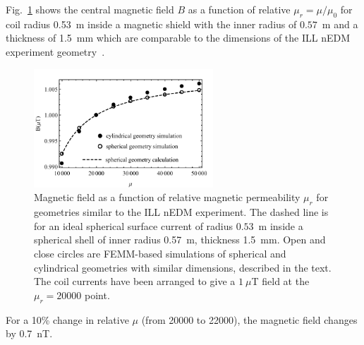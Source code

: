 \documentclass[review]{elsarticle}
\begin{document}

%
Fig.~\ref{fig:Magnetic_Field} shows the central magnetic field $B$ as
a function of relative $\mu_r=\mu/\mu_0$ for coil radius 0.53~m inside
a magnetic shield with the inner radius of $0.57$~m and a thickness of
1.5~mm which are comparable to the dimensions of the ILL nEDM
experiment geometry~\cite{bib:baker,bib:knecht}.
\begin{figure}[h!]
\begin{center}
   \includegraphics[width=0.6\textwidth]{femm_and_calcs.pdf}
    \caption{Magnetic field as a function of relative magnetic
      permeability $\mu_r$ for geometries similar to the ILL nEDM
      experiment.  The dashed line is for an ideal spherical surface
      current of radius $0.53$~m inside a spherical shell of inner
      radius 0.57~m, thickness 1.5~mm.  Open and close circles are
      FEMM-based simulations of spherical and cylindrical geometries
      with similar dimensions, described in the text.  The coil
      currents have been arranged to give a $1~\mu$T field at the
      $\mu_r=20000$ point.}
    \label{fig:Magnetic_Field}
    \end{center}
\end{figure} 
For a 10\% change in relative $\mu$ (from 20000 to 22000), the
magnetic field changes by 0.7~nT.
\end{document}
